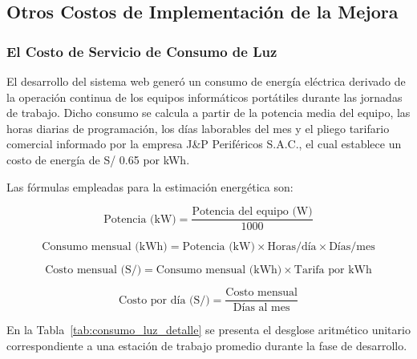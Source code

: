 \subsection{Otros Costos de Implementación de la Mejora}

\subsubsection{El Costo de Servicio de Consumo de Luz}

El desarrollo del sistema web generó un consumo de energía eléctrica derivado de la operación continua de los equipos informáticos portátiles durante las jornadas de trabajo. 
Dicho consumo se calcula a partir de la potencia media del equipo, las horas diarias de programación, 
los días laborables del mes y el pliego tarifario comercial informado por la empresa J\&P Periféricos S.A.C., el cual establece un costo de energía de S/ 0.65 por kWh.

Las fórmulas empleadas para la estimación energética son:

\begin{equation}
    \text{Potencia (kW)} = \frac{\text{Potencia del equipo (W)}}{1000}
\end{equation}

\begin{equation}
    \text{Consumo mensual (kWh)} = \text{Potencia (kW)} \times \text{Horas/día} \times \text{Días/mes}
\end{equation}

\begin{equation}
    \text{Costo mensual (S/)} = \text{Consumo mensual (kWh)} \times \text{Tarifa por kWh}
\end{equation}

\begin{equation}
    \text{Costo por día (S/)} = \frac{\text{Costo mensual}}{\text{Días al mes}}
\end{equation}

En la Tabla~\ref{tab:consumo_luz_detalle} se presenta el desglose aritmético unitario correspondiente a una estación de trabajo promedio durante la fase de desarrollo.


